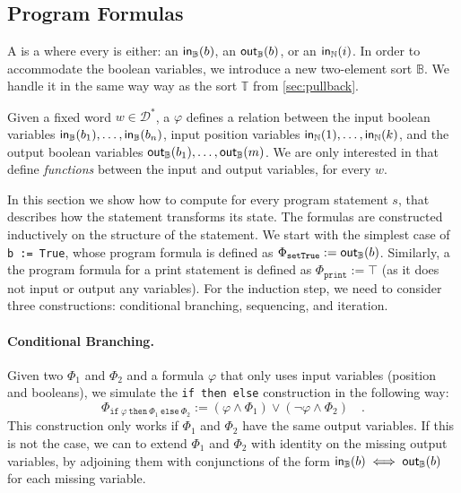 \subsection{Program Formulas}
\label{sec:program-formulas}

\AP A  is a  where every
 is either: an 
$\mathsf{in}_{\mathbb{B}}(b)$, an  $\mathsf{out}_{\mathbb{B}}(b)$, or an
 $\mathsf{in}_{\mathbb{N}}(i)$. In order to accommodate the
boolean variables, we introduce a new two-element sort $\mathbb{B}$. 
We handle it in the same way way as the sort $\mathbb{T}$ from \cref{sec:pullback}.

Given a fixed word $w \in \mathcal{D}^*$, a 
$\varphi$ defines a relation between the input boolean variables
$\mathsf{in}_{\mathbb{B}}(b_1), \dots, \mathsf{in}_{\mathbb{B}}(b_n)$, input position variables
$\mathsf{in}_{\mathbb{N}}(1), \dots, \mathsf{in}_{\mathbb{N}}(k)$, and the output boolean variables
$\mathsf{out}_{\mathbb{B}}(b_1), \dots, \mathsf{out}_{\mathbb{B}}(m)$. We are only interested in 
that define \emph{functions} between the input and output variables, 
for every $w$.

In this section we show how to compute  for every
program statement $s$, that describes how the statement transforms its state.
The formulas are constructed inductively on the structure of the statement.
We start with the simplest case of \texttt{b := True}, whose program 
formula is defined as $\Phi_{\texttt{setTrue}} := \mathsf{out}_{\mathbb{B}}(b)$.
Similarly, a the program formula for a print statement is defined 
as $\Phi_{\texttt{print}} := \top$ (as it does not input or output any variables).
For the induction step, we need to consider three constructions: conditional
branching, sequencing, and iteration.

\paragraph{Conditional Branching.} 
Given two  $\Phi_1$ and $\Phi_2$
and a formula $\varphi$ that only uses input variables (position and booleans), 
we simulate the \texttt{if then else} construction in the following way:
\begin{equation*}
    \Phi_{\texttt{if}~\varphi~\texttt{then}~\Phi_1~\texttt{else}~\Phi_2} := (\varphi \land \Phi_1) \lor (\neg \varphi \land \Phi_2) \quad .
\end{equation*}
This construction only works if $\Phi_1$ and $\Phi_2$ have the same output variables. 
If this is not the case, we can to extend $\Phi_1$ and $\Phi_2$ with 
identity on the missing output variables, by adjoining them
with conjunctions of the form  $\mathsf{in}_{\mathbb{B}}(b) \iff \mathsf{out}_{\mathbb{B}}(b)$
for each missing variable. 

